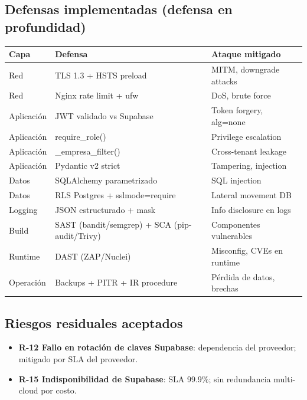 \documentclass[12pt,a4paper,oneside]{article}
\begin{document}
\subsection{Defensas implementadas (defensa en profundidad)}

\begin{table}[h]
\centering
\small
\begin{tabularx}{\textwidth}{llX}
\toprule
\textbf{Capa} & \textbf{Defensa} & \textbf{Ataque mitigado} \\
\midrule
Red & TLS 1.3 + HSTS preload & MITM, downgrade attacks \\
Red & Nginx rate limit + ufw & DoS, brute force \\
Aplicación & JWT validado vs Supabase & Token forgery, alg=none \\
Aplicación & require\_role() & Privilege escalation \\
Aplicación & \_empresa\_filter() & Cross-tenant leakage \\
Aplicación & Pydantic v2 strict & Tampering, injection \\
Datos & SQLAlchemy parametrizado & SQL injection \\
Datos & RLS Postgres + sslmode=require & Lateral movement DB \\
Logging & JSON estructurado + mask & Info disclosure en logs \\
Build & SAST (bandit/semgrep) + SCA (pip-audit/Trivy) & Componentes vulnerables \\
Runtime & DAST (ZAP/Nuclei) & Misconfig, CVEs en runtime \\
Operación & Backups + PITR + IR procedure & Pérdida de datos, brechas \\
\bottomrule
\end{tabularx}
\end{table}

\subsection{Riesgos residuales aceptados}

\begin{itemize}[leftmargin=*]
  \item \textbf{R-12 Fallo en rotación de claves Supabase}: dependencia del proveedor; mitigado por SLA del proveedor.
  \item \textbf{R-15 Indisponibilidad de Supabase}: SLA 99.9\%; sin redundancia multi-cloud por costo.
\end{itemize}
\end{document}
